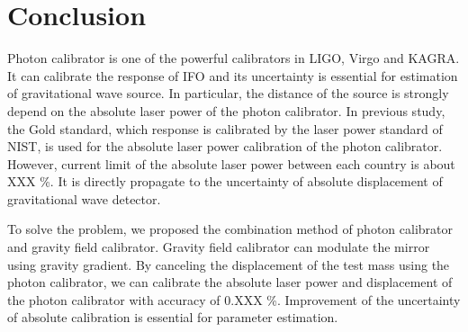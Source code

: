 \documentclass[12pt]{iopart}
\begin{document}
\section{Conclusion}
Photon calibrator is one of the powerful calibrators in LIGO, Virgo and KAGRA. It can calibrate the response of IFO and its uncertainty is essential for estimation of gravitational wave source. In particular, the distance of the source is strongly depend on the absolute laser power of the photon calibrator. In previous study, the Gold standard, which response is calibrated by the laser power standard of NIST, is used for the absolute laser power calibration of the photon calibrator. However, current limit of the absolute laser power between each country is about XXX \%. It is directly propagate to the uncertainty of absolute displacement of gravitational wave detector.

To solve the problem, we proposed the combination method of photon calibrator and gravity field calibrator. Gravity field calibrator can modulate the mirror using gravity gradient. By canceling the displacement of the test mass using the photon calibrator, we can calibrate the absolute laser power and displacement of the photon calibrator with accuracy of 0.XXX \%. Improvement of the uncertainty of absolute calibration is essential for parameter estimation.

\begin{verbatim}

\end{verbatim}
\end{document}
